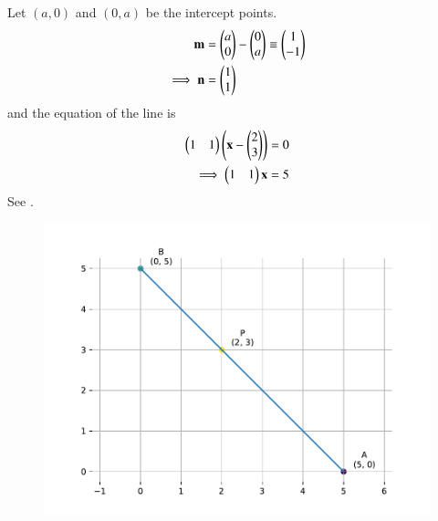 Let $(a,0)$  and  $(0,a)$ be the intercept points. 
\begin{align}
\mathbf{m} 
        &=   \begin{pmatrix}
		a \\
		0 
		\end{pmatrix} - \begin{pmatrix}
		   0 \\
		   a
		\end{pmatrix}  
        		  \equiv \begin{pmatrix}
                           1 \\
			   -1 
		         \end{pmatrix} 
			 \\
			 \implies
\mathbf{n} &=  \begin{pmatrix}
		     1 \\
		     1
	     \end{pmatrix} 
\end{align}
and 
the equation of the  line is
\begin{align}
	\begin{pmatrix} 1 & 1 \end{pmatrix} \left( \mathbf{ x  - \begin{pmatrix} 2 \\
                                   3
			     \end{pmatrix}
		}\right)  &= 0  \\
\implies		\begin{pmatrix} 1 & 1\end{pmatrix} \mathbf{x}  &= 5 
        \label{eq:11/10/2/12/1}
\end{align}
See  .
\begin{figure}[H]
	\begin{center}
		\includegraphics[width=0.75\columnwidth]{chapters/11/10/2/12/figs/fig.pdf}
	\end{center}
\caption{}
\label{fig:11/10/2/12/Fig1}
\end{figure}


